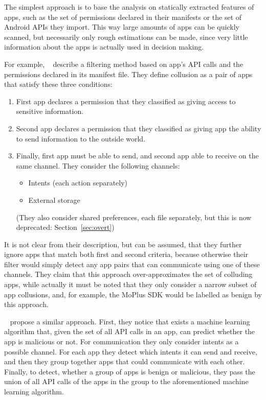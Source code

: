 \documentclass[article, oneside]{aaltoseries}
\newcommand{\Sref}[1]{Section~\ref{#1}}
\begin{document}
The simplest approach is to base the analysis on statically extracted features of apps, such as the set of permissions declared in their manifests or the set of Android APIs they import. This way large amounts of apps can be quickly scanned, but necessarily only rough estimations can be made, since very little information about the apps is actually used in decision making.

For example, \citeauthor{Asavoae2016}~\cite{Asavoae2016} describe a filtering method based on app's API calls and the permissions declared in its manifest file. They define collusion as a pair of apps that satisfy these three conditions:
\begin{enumerate}
	\item First app declares a permission that they classified as giving access to sensitive information.
	\item Second app declares a permission that they classified as giving app the ability to send information to the outside world.
	\item Finally, first app must be able to send, and second app able to receive on the same channel. They consider the following channels:
	\begin{itemize}[nosep]
		\item Intents (each action separately)
		\item External storage
	\end{itemize}
	(They also consider shared preferences, each file separately, but this is now deprecated: \Sref{sec:overt})
\end{enumerate}
It is not clear from their description, but can be assumed, that they further ignore apps that match both first and second criteria, because otherwise their filter would simply detect any app pairs that can communicate using one of these channels. They claim that this approach over-approximates the set of colluding apps, while actually it must be noted that they only consider a narrow subset of app collusions, and, for example, the MoPlus SDK would be labelled as benign by this approach.

\citeauthor{Chen2018}~\cite{Chen2018} propose a similar approach. First, they notice that exists a machine learning algorithm that, given the set of all API calls in an app, can predict whether the app is malicious or not. For communication they only consider intents as a possible channel. For each app they detect which intents it can send and receive, and then they group together apps that could communicate with each other. Finally, to detect, whether a group of apps is benign or malicious, they pass the union of all API calls of the apps in the group to the aforementioned machine learning algorithm.
\end{document}
